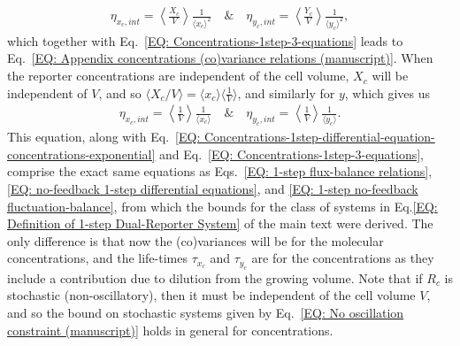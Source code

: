 \documentclass[%
 reprint,prx,
superscriptaddress,
%
%
%
%
%
%
%
%
%
 amsmath,amssymb,
 aps,
%
%
%
%
%
%
]{revtex4-2}
\begin{document}
{{\begin{align}
 \eta_{x_{c},int} = \left \langle \frac{X_{c}}{V} \right \rangle \frac{1}{\langle x_{c} \rangle^{2}} \quad \text{\&} \quad  \eta_{y_{c},int} = \left \langle \frac{Y_{c}}{V} \right \rangle \frac{1}{\langle y_{c} \rangle^{2}} ,
 \label{EQ: Concentrations intrinsic terms general}
\end{align}
which together with Eq.~\eqref{EQ: Concentrations-1step-3-equations} leads to Eq.~\eqref{EQ: Appendix concentrations (co)variance relations (manuscript)}.
When the reporter concentrations are independent of the cell volume, $X_{c}$ will be independent of $V$, and so $\langle X_{c}/V\rangle = \langle x_{c} \rangle \langle \frac{1}{V} \rangle$, and similarly for $y$, which gives us
\begin{align}
 \eta_{x_{c},int} = \left \langle \frac{1}{V} \right \rangle \frac{1}{\langle x_{c} \rangle} \quad \text{\&} \quad  \eta_{y_{c},int} = \left \langle \frac{1}{V} \right \rangle \frac{1}{\langle y_{c} \rangle} .
  \label{EQ: Concentrations intrinsic terms volume independent}
\end{align}
This equation, along with Eq.~\eqref{EQ: Concentrations-1step-differential-equation-concentrations-exponential} and 
Eq.~\eqref{EQ: Concentrations-1step-3-equations}, comprise the exact same equations as Eqs.~\eqref{EQ: 1-step flux-balance relations}, \eqref{EQ: no-feedback 1-step differential equations}, and \eqref{EQ: 1-step no-feedback fluctuation-balance}, from which the bounds for the class of systems in Eq.\eqref{EQ: Definition of 1-step Dual-Reporter System} of the main text were derived. 
The only difference is that now the (co)variances will be for the molecular concentrations, and the life-times $\tau_{x_{c}}$ and $\tau_{y_{c}}$ are for the concentrations as 
they include a contribution due to dilution from the growing volume. Note that if $R_{c}$ is stochastic (non-oscillatory), then it must be independent of the cell volume $V$, and so the bound on stochastic systems given by Eq.~\eqref{EQ: No oscillation constraint (manuscript)} holds in general for concentrations.




















}}
\end{document}
